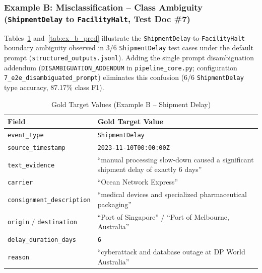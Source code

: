 \documentclass[11pt,a4paper]{article}
\begin{document}
\subsubsection*{Example B: Misclassification -- Class Ambiguity (\texttt{ShipmentDelay} to \texttt{FacilityHalt}, Test Doc \#7)}
Tables~\ref{tab:ex_b_gold} and~\ref{tab:ex_b_pred} illustrate the \texttt{ShipmentDelay}-to-\texttt{FacilityHalt} boundary ambiguity observed in 3/6 \texttt{ShipmentDelay} test cases under the default prompt (\texttt{structured\_outputs.jsonl}). Adding the single prompt disambiguation addendum (\texttt{DISAMBIGUATION\_ADDENDUM} in \texttt{pipeline\_core.py}; configuration \texttt{7\_e2e\_disambiguated\_prompt}) eliminates this confusion (6/6 \texttt{ShipmentDelay} type accuracy, 87.17\% class F1).

\begin{table}[htbp]
\centering
\caption{Gold Target Values (Example B -- Shipment Delay)}
\label{tab:ex_b_gold}
\begin{tabular}{@{}p{3.8cm} p{8.7cm}@{}}
\toprule
\textbf{Field} & \textbf{Gold Target Value} \\
\midrule
\texttt{event\_type} & \texttt{ShipmentDelay} \\
\texttt{source\_timestamp} & \texttt{2023-11-10T00:00:00Z} \\
\texttt{text\_evidence} & ``manual processing slow-down caused a significant shipment delay of exactly 6 days'' \\
\texttt{carrier} & ``Ocean Network Express'' \\
\texttt{consignment\_description} & ``medical devices and specialized pharmaceutical packaging'' \\
\texttt{origin} / \texttt{destination} & ``Port of Singapore'' / ``Port of Melbourne, Australia'' \\
\texttt{delay\_duration\_days} & \texttt{6} \\
\texttt{reason} & ``cyberattack and database outage at DP World Australia'' \\
\bottomrule
\end{tabular}
\end{table}
\end{document}
